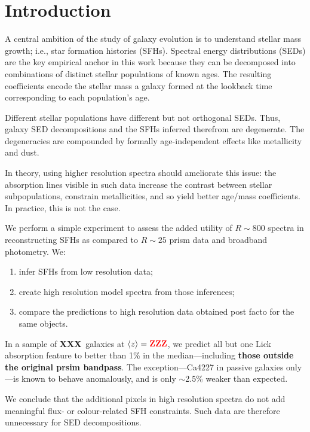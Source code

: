 \documentclass[a4paper,fleqn,usenatbib]{mnras}
\newcommand{\bfr}{\bf\color{red}}
\newcommand{\benum}{\begin{enumerate}}
\newcommand{\eenum}{\end{enumerate}}
\newcommand{\ntot}{{\bfr XXX}} %
\newcommand{\midz}{{\bfr ZZZ}} %
\begin{document}
\section{Introduction}
\label{sec:intro}

A central ambition of the study of galaxy evolution is to understand stellar mass growth; i.e., 
star formation histories (SFHs). Spectral energy distributions (SEDs) are the key empirical anchor 
in this work because they can be decomposed into combinations of distinct stellar populations of 
known ages. The resulting coefficients encode the stellar mass a galaxy formed at the lookback time 
corresponding to each population's age.
	
Different stellar populations have different but not orthogonal SEDs. Thus, galaxy SED decompositions 
and the SFHs inferred therefrom are degenerate. The degeneracies are compounded by 
formally age-independent effects like metallicity and dust. 

In theory, using higher resolution spectra should ameliorate this issue: the absorption lines visible 
in such data increase the contrast between stellar subpopulations, constrain metallicities, and so yield 
better age/mass coefficients. In practice, this is not the case.

We perform a simple experiment to assess the added utility of $R\sim800$ spectra in 
reconstructing SFHs as compared to $R\sim25$ prism data and broadband photometry. We:
\benum
	\item infer SFHs from low resolution data;
	\item create high resolution model spectra from those inferences;
	\item compare the predictions to high resolution data obtained post facto for the same
		objects. 
\eenum

In a sample of \ntot\ galaxies at $\langle z\rangle=\midz$, we predict all but one Lick absorption 
feature \citep{Worthey94} to better than 1\% in the median---including 
{\bfr those outside the original prsim bandpass}. The exception---Ca4227 in passive 
galaxies only---is known to behave anomalously, and is only $\sim$2.5\% weaker than expected. 

We conclude that the additional pixels in high resolution spectra do not add meaningful 
flux- or colour-related SFH constraints. Such data are therefore unnecessary for SED decompositions.
\end{document}
